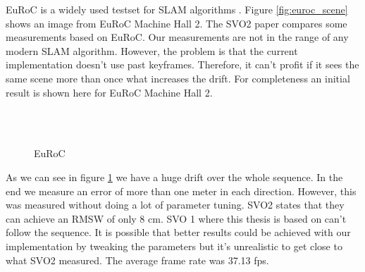 \documentclass[11pt,a4paper,titlepage,oneside]{report}
\begin{document}
EuRoC is a widely used testset for SLAM algorithms \cite{euroc}. Figure \ref{fig:euroc_scene} shows an image from EuRoC Machine Hall 2. The SVO2 paper \cite{svo2} compares some measurements based on EuRoC. Our measurements are not in the range of any modern SLAM algorithm. However, the problem is that the current implementation doesn't use past keyframes. Therefore, it can't profit if it sees the same scene more than once what increases the drift. For completeness an initial result is shown here for EuRoC Machine Hall 2.

\begin{figure}[H]
  \\
  \\
  \caption{EuRoC }\label{fig:euroc}
\end{figure}

As we can see in figure \ref{fig:euroc} we have a huge drift over the whole sequence. In the end we measure an error of more than one meter in each direction. However, this was measured without doing a lot of parameter tuning. SVO2 states that they can achieve an RMSW of only 8 cm. SVO 1 where this thesis is based on can't follow the sequence. It is possible that better results could be achieved with our implementation by tweaking the parameters but it's unrealistic to get close to what SVO2 measured. The average frame rate was 37.13 fps.
\end{document}
